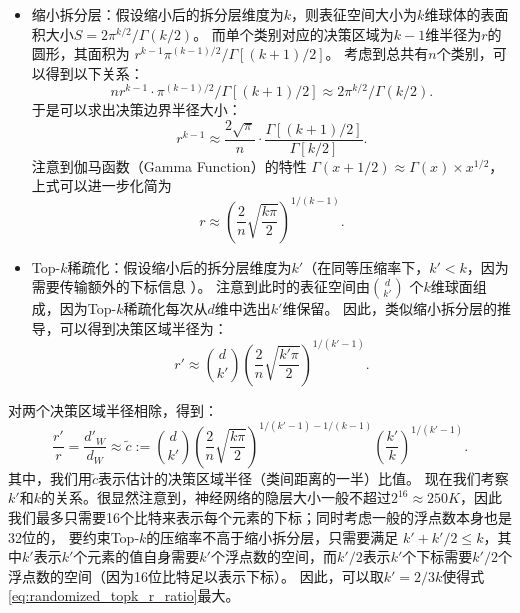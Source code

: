 \begin{itemize}
    \item 
    缩小拆分层：假设缩小后的拆分层维度为$k$，则表征空间大小为$k$维球体的表面积大小$S = 2\pi^{k/2}/\Gamma(k/2)$。
    而单个类别对应的决策区域为$k - 1$维半径为$r$的圆形，其面积为 $r^{k-1}\pi^{(k-1)/2} / \Gamma[(k + 1)/2]$。
    考虑到总共有$n$个类别，可以得到以下关系：
    \begin{equation}
        n r^{k-1} \cdot \pi^{(k-1)/2} / \Gamma[(k + 1)/2] \approx 2\pi^{k/2}/\Gamma(k/2).
    \end{equation}
    于是可以求出决策边界半径大小：
    \begin{equation}
        r^{k-1} \approx \dfrac{2\sqrt\pi}{n} \cdot \dfrac{\Gamma[(k+1)/2]}{\Gamma[k/2]}.
    \end{equation}
    注意到伽马函数（Gamma Function）的特性 $\Gamma(x + 1/2) \approx \Gamma(x)\times x^{1/2}$，上式可以进一步化简为
    \begin{equation}
        r \approx \left(\dfrac{2}{n} \sqrt{\dfrac{k\pi}{2}} \right)^{1/(k-1)}.
    \end{equation}

    \item
    Top-$k$稀疏化：假设缩小后的拆分层维度为$k'$（在同等压缩率下，$k' < k$，因为需要传输额外的下标信息 ）。
    注意到此时的表征空间由${d \choose k'}$ 个$k$维球面组成，因为Top-$k$稀疏化每次从$d$维中选出$k'$维保留。
    因此，类似缩小拆分层的推导，可以得到决策区域半径为：
    \begin{equation}
        r' \approx {d \choose k'} \left(\dfrac{2}{n} \sqrt{\dfrac{k'\pi}{2}} \right)^{1/(k'-1)}.
    \end{equation}
\end{itemize}
%
对两个决策区域半径相除，得到：
\begin{equation}
\label{eq:randomized_topk_r_ratio}
    \dfrac{r'}{r} = \dfrac{d'_W}{d_W} \approx \tilde c := {d \choose k'} \left( \dfrac2n \sqrt{\dfrac{k\pi}{2}} \right)^
    {1/(k'-1) - 1/(k-1)} \left(\dfrac{k'}{k}\right)^{1/(k' - 1)}.
\end{equation}
%
其中，我们用$\tilde c$表示估计的决策区域半径（类间距离的一半）比值。
%
现在我们考察$k'$和$k$的关系。很显然注意到，神经网络的隐层大小一般不超过$2^{16}\approx 250K$，因此我们最多只需要16个比特来表示每个元素的下标；同时考虑一般的浮点数本身也是32位的，
要约束Top-$k$的压缩率不高于缩小拆分层，只需要满足
$k' +  k'/2 \le k$，其中$k'$表示$k'$个元素的值自身需要$k'$个浮点数的空间，而$k'/2$表示$k'$个下标需要$k'/2$个浮点数的空间（因为16位比特足以表示下标）。
%
因此，可以取$k' = 2/3 k$使得式\eqref{eq:randomized_topk_r_ratio}最大。
%

